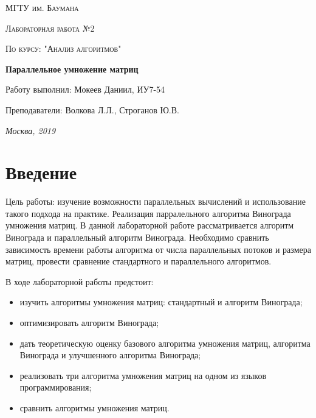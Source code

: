 \documentclass[12pt]{report}
\begin{document}
\begin{titlepage}
	\centering
	{\scshape\LARGE МГТУ им. Баумана \par}
	\vspace{3cm}
	{\scshape\Large Лабораторная работа №2\par}
	\vspace{0.5cm}	
	{\scshape\Large По курсу: "Анализ алгоритмов"\par}
	\vspace{1.5cm}
	{\huge\bfseries Параллельное умножение матриц\par}
	\vspace{2cm}
	\Large Работу выполнил: Мокеев Даниил, ИУ7-54\par
	\vspace{0.5cm}
	\Large Преподаватели:  Волкова Л.Л., Строганов Ю.В.\par

	\vfill
	\large \textit {Москва, 2019} \par
\end{titlepage}

\tableofcontents

\newpage
\chapter*{Введение}

Цель работы: изучение возможности параллельных вычислений и использование такого подхода на практике. Реализация парралельного алгоритма Винограда умножения матриц. В данной лабораторной работе рассматривается алгоритм Винограда и параллельный алгоритм Винограда. Необходимо сравнить зависимость времени работы алгоритма от числа параллельных потоков и размера матриц, провести сравнение стандартного и параллельного алгоритмов.

В ходе лабораторной работы предстоит:
\begin{itemize}
	\item изучить алгоритмы умножения матриц: стандартный и алгоритм Винограда; 
	\item оптимизировать алгоритм Винограда; 
	\item дать теоретическую оценку базового алгоритма умножения матриц, алгоритма Винограда и улучшенного алгоритма Винограда;
	\item реализовать три алгоритма умножения матриц на одном из языков программирования;  
	\item сравнить алгоритмы умножения матриц.
\end{itemize}
\end{document}
